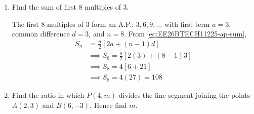 \begin{enumerate}[label=\thesubsection.\arabic*, ref=\thesubsection.\theenumi]
\solution Opposite sides of a rectangle are equal in length.
\begin{align}
    x + y &= 30 \label{eq:EE26BTECH11225-rect-1} \\
    x - y &= 14 \label{eq:EE26BTECH11225-rect-2}
\end{align}
Adding \eqref{eq:EE26BTECH11225-rect-1} and \eqref{eq:EE26BTECH11225-rect-2}:
\begin{align}
    (x + y) + (x - y) &= 30 + 14 \\
    &\implies 2x = 44 \\
    &\implies x = 22
\end{align}
Substituting $x = 22$ into \eqref{eq:EE26BTECH11225-rect-1}:
\begin{align}
    22 + y &= 30 \\
    &\implies y = 30 - 22 \\
    &\implies y = 8
\end{align}
Thus, $x = 22$ and $y = 8$.
    \item Find the sum of first 8 multiples of 3.

\solution The first 8 multiples of 3 form an A.P.: $3, 6, 9, \dots$ with first term $a = 3$, common difference $d = 3$, and $n = 8$. From \eqref{eq:EE26BTECH11225-ap-sum},
\begin{align}
    S_n &= \frac{n}{2}[2a + (n-1)d] \\
    &\implies S_8 = \frac{8}{2}[2(3) + (8-1)3] \\
    &\implies S_8 = 4[6 + 21] \\
    &\implies S_8 = 4(27) = 108
\end{align}
    \item Find the ratio in which $P(4, m)$ divides the line segment joining the points $A(2, 3)$ and $B(6, -3)$. Hence find $m$.


\end{enumerate}
